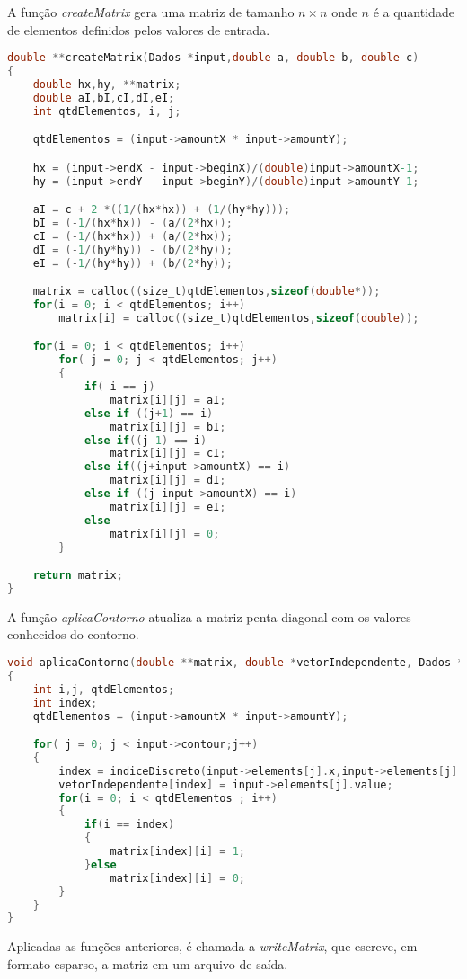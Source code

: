 \documentclass[
	11pt,				%
	oneside,			%
	a4paper,			%
	english,			%
	brazil,				%
	]{article}
\begin{document}
A função \textit{createMatrix} gera uma matriz de tamanho $n \times n$ onde $n$ é a quantidade de elementos definidos pelos valores de entrada.
\begin{lstlisting}[language=C, caption=Função Cria Matriz]
double **createMatrix(Dados *input,double a, double b, double c)
{
	double hx,hy, **matrix;
	double aI,bI,cI,dI,eI;
	int qtdElementos, i, j;

	qtdElementos = (input->amountX * input->amountY);

	hx = (input->endX - input->beginX)/(double)input->amountX-1;
	hy = (input->endY - input->beginY)/(double)input->amountY-1;

	aI = c + 2 *((1/(hx*hx)) + (1/(hy*hy)));
	bI = (-1/(hx*hx)) - (a/(2*hx));
	cI = (-1/(hx*hx)) + (a/(2*hx));
	dI = (-1/(hy*hy)) - (b/(2*hy));
	eI = (-1/(hy*hy)) + (b/(2*hy));

	matrix = calloc((size_t)qtdElementos,sizeof(double*));
	for(i = 0; i < qtdElementos; i++)
		matrix[i] = calloc((size_t)qtdElementos,sizeof(double));

	for(i = 0; i < qtdElementos; i++)
		for( j = 0; j < qtdElementos; j++)
		{
			if( i == j)
				matrix[i][j] = aI;
			else if ((j+1) == i)
				matrix[i][j] = bI;
			else if((j-1) == i)
				matrix[i][j] = cI;
			else if((j+input->amountX) == i)
				matrix[i][j] = dI;
			else if ((j-input->amountX) == i)
				matrix[i][j] = eI;
			else
				matrix[i][j] = 0;
		}

	return matrix;
}
\end{lstlisting}

A função \textit{aplicaContorno} atualiza a matriz penta-diagonal com os valores conhecidos do contorno.
\begin{lstlisting}[language=C, caption=Função Insere Contorno]
void aplicaContorno(double **matrix, double *vetorIndependente, Dados *input)
{
	int i,j, qtdElementos;
	int index;
	qtdElementos = (input->amountX * input->amountY);

	for( j = 0; j < input->contour;j++)
	{
		index = indiceDiscreto(input->elements[j].x,input->elements[j].y,input->amountX);
		vetorIndependente[index] = input->elements[j].value;
		for(i = 0; i < qtdElementos ; i++)
		{
			if(i == index)
			{
				matrix[index][i] = 1;
			}else
				matrix[index][i] = 0;
		}
	}
}
\end{lstlisting}

Aplicadas as funções anteriores, é chamada a \textit{writeMatrix}, que escreve, em formato esparso, a matriz em um arquivo de saída.
\end{document}
